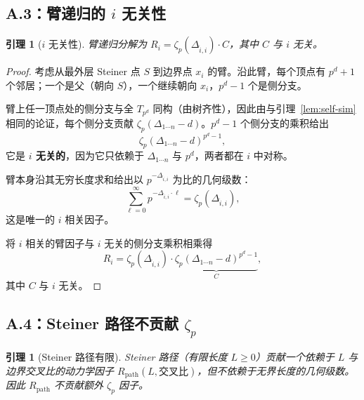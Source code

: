 \documentclass[11pt,a4paper]{ctexart}
\newtheorem{lemma}[theorem]{引理}
\theoremstyle{remark}
\begin{document}
\subsection{A.3：臂递归的 $i$ 无关性}

\begin{lemma}[$i$ 无关性]
\label{lem:i-indep}
臂递归分解为 $R_i = \zeta_p(\Delta_{\hat{i},i}) \cdot C$，其中 $C$ 与 $i$ 无关。
\end{lemma}

\begin{proof}
考虑从最外层 Steiner 点 $S$ 到边界点 $x_i$ 的臂。沿此臂，每个顶点有 $p^d{+}1$ 个邻居；一个是父（朝向 $S$），一个继续朝向 $x_i$，$p^d - 1$ 个是侧分支。

臂上任一顶点处的侧分支与全 $T_{p^d}$ 同构（由树齐性），因此由与引理~\ref{lem:self-sim} 相同的论证，每个侧分支贡献 $\zeta_p(\Delta_{1\cdots n} - d)$。$p^d - 1$ 个侧分支的乘积给出
\begin{equation}
\zeta_p(\Delta_{1\cdots n} - d)^{p^d - 1},
\end{equation}
它是 \textbf{$i$ 无关的}，因为它只依赖于 $\Delta_{1\cdots n}$ 与 $p^d$，两者都在 $i$ 中对称。

臂本身沿其无穷长度求和给出以 $p^{-\Delta_{\hat{i},i}}$ 为比的几何级数：
\begin{equation}
\sum_{\ell=0}^\infty p^{-\Delta_{\hat{i},i} \cdot \ell} = \zeta_p(\Delta_{\hat{i},i}),
\end{equation}
这是唯一的 $i$ 相关因子。

将 $i$ 相关的臂因子与 $i$ 无关的侧分支乘积相乘得
\begin{equation}
R_i = \zeta_p(\Delta_{\hat{i},i}) \cdot \underbrace{\zeta_p(\Delta_{1\cdots n} - d)^{p^d - 1}}_{C},
\end{equation}
其中 $C$ 与 $i$ 无关。\qedhere
\end{proof}

\subsection{A.4：Steiner 路径不贡献 $\zeta_p$}

\begin{lemma}[Steiner 路径有限]
\label{lem:path}
Steiner 路径（有限长度 $L \geq 0$）贡献一个依赖于 $L$ 与边界交叉比的动力学因子 $R_{\mathrm{path}}(L, \text{交叉比})$，但\emph{不}依赖于无界长度的几何级数。因此 $R_{\mathrm{path}}$ 不贡献额外 $\zeta_p$ 因子。
\end{lemma}
\end{document}
